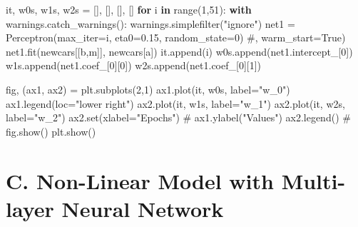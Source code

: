 \documentclass[
  letterpaper,
]{scrbook}
\newenvironment{Shaded}{\begin{snugshade}}{\end{snugshade}}
\newcommand{\BuiltInTok}[1]{\textcolor[rgb]{0.00,0.23,0.31}{#1}}
\newcommand{\CommentTok}[1]{\textcolor[rgb]{0.37,0.37,0.37}{#1}}
\newcommand{\ControlFlowTok}[1]{\textcolor[rgb]{0.00,0.23,0.31}{\textbf{#1}}}
\newcommand{\DecValTok}[1]{\textcolor[rgb]{0.68,0.00,0.00}{#1}}
\newcommand{\FloatTok}[1]{\textcolor[rgb]{0.68,0.00,0.00}{#1}}
\newcommand{\KeywordTok}[1]{\textcolor[rgb]{0.00,0.23,0.31}{\textbf{#1}}}
\newcommand{\NormalTok}[1]{\textcolor[rgb]{0.00,0.23,0.31}{#1}}
\newcommand{\OperatorTok}[1]{\textcolor[rgb]{0.37,0.37,0.37}{#1}}
\newcommand{\StringTok}[1]{\textcolor[rgb]{0.13,0.47,0.30}{#1}}
\begin{document}
\begin{Shaded}
\begin{Highlighting}[]
\NormalTok{it, w0s, w1s, w2s }\OperatorTok{=}\NormalTok{ [], [], [], []}
\ControlFlowTok{for}\NormalTok{ i }\KeywordTok{in} \BuiltInTok{range}\NormalTok{(}\DecValTok{1}\NormalTok{,}\DecValTok{51}\NormalTok{):}
    \ControlFlowTok{with}\NormalTok{ warnings.catch\_warnings():}
\NormalTok{        warnings.simplefilter(}\StringTok{"ignore"}\NormalTok{)}
\NormalTok{        net1 }\OperatorTok{=}\NormalTok{ Perceptron(max\_iter}\OperatorTok{=}\NormalTok{i, eta0}\OperatorTok{=}\FloatTok{0.15}\NormalTok{, random\_state}\OperatorTok{=}\DecValTok{0}\NormalTok{) }\CommentTok{\#, warm\_start=True)}
\NormalTok{        net1.fit(newcars[[}\StringTok{\textquotesingle{}b\textquotesingle{}}\NormalTok{,}\StringTok{\textquotesingle{}m\textquotesingle{}}\NormalTok{]], newcars[}\StringTok{\textquotesingle{}a\textquotesingle{}}\NormalTok{])}
\NormalTok{    it.append(i)}
\NormalTok{    w0s.append(net1.intercept\_[}\DecValTok{0}\NormalTok{])}
\NormalTok{    w1s.append(net1.coef\_[}\DecValTok{0}\NormalTok{][}\DecValTok{0}\NormalTok{])}
\NormalTok{    w2s.append(net1.coef\_[}\DecValTok{0}\NormalTok{][}\DecValTok{1}\NormalTok{])}

\NormalTok{fig, (ax1, ax2) }\OperatorTok{=}\NormalTok{ plt.subplots(}\DecValTok{2}\NormalTok{,}\DecValTok{1}\NormalTok{)}
\NormalTok{ax1.plot(it, w0s, label}\OperatorTok{=}\StringTok{"w\_0"}\NormalTok{)}
\NormalTok{ax1.legend(loc}\OperatorTok{=}\StringTok{"lower right"}\NormalTok{)}
\NormalTok{ax2.plot(it, w1s, label}\OperatorTok{=}\StringTok{"w\_1"}\NormalTok{)}
\NormalTok{ax2.plot(it, w2s, label}\OperatorTok{=}\StringTok{"w\_2"}\NormalTok{)}
\NormalTok{ax2.}\BuiltInTok{set}\NormalTok{(xlabel}\OperatorTok{=}\StringTok{"Epochs"}\NormalTok{)}
\CommentTok{\# ax1.ylabel("Values")}
\NormalTok{ax2.legend()}
\CommentTok{\# fig.show()}
\NormalTok{plt.show()}
\end{Highlighting}
\end{Shaded}

\section*{C. Non-Linear Model with Multi-layer Neural
Network}\label{c.-non-linear-model-with-multi-layer-neural-network}

\end{document}
